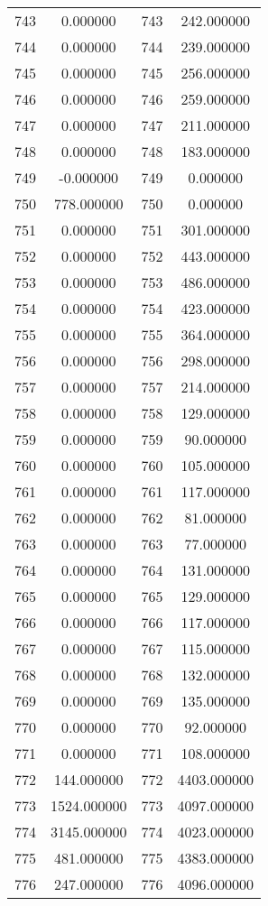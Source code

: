 \documentclass[12pt]{article}
\begin{document}
\begin{longtable}{@{}cccc@{}}
743 & 0.000000 & 743 & 242.000000 \\
744 & 0.000000 & 744 & 239.000000 \\
745 & 0.000000 & 745 & 256.000000 \\
746 & 0.000000 & 746 & 259.000000 \\
747 & 0.000000 & 747 & 211.000000 \\
748 & 0.000000 & 748 & 183.000000 \\
749 & -0.000000 & 749 & 0.000000 \\
750 & 778.000000 & 750 & 0.000000 \\
751 & 0.000000 & 751 & 301.000000 \\
752 & 0.000000 & 752 & 443.000000 \\
753 & 0.000000 & 753 & 486.000000 \\
754 & 0.000000 & 754 & 423.000000 \\
755 & 0.000000 & 755 & 364.000000 \\
756 & 0.000000 & 756 & 298.000000 \\
757 & 0.000000 & 757 & 214.000000 \\
758 & 0.000000 & 758 & 129.000000 \\
759 & 0.000000 & 759 & 90.000000 \\
760 & 0.000000 & 760 & 105.000000 \\
761 & 0.000000 & 761 & 117.000000 \\
762 & 0.000000 & 762 & 81.000000 \\
763 & 0.000000 & 763 & 77.000000 \\
764 & 0.000000 & 764 & 131.000000 \\
765 & 0.000000 & 765 & 129.000000 \\
766 & 0.000000 & 766 & 117.000000 \\
767 & 0.000000 & 767 & 115.000000 \\
768 & 0.000000 & 768 & 132.000000 \\
769 & 0.000000 & 769 & 135.000000 \\
770 & 0.000000 & 770 & 92.000000 \\
771 & 0.000000 & 771 & 108.000000 \\
772 & 144.000000 & 772 & 4403.000000 \\
773 & 1524.000000 & 773 & 4097.000000 \\
774 & 3145.000000 & 774 & 4023.000000 \\
775 & 481.000000 & 775 & 4383.000000 \\
776 & 247.000000 & 776 & 4096.000000 \\

\end{longtable}
\end{document}
